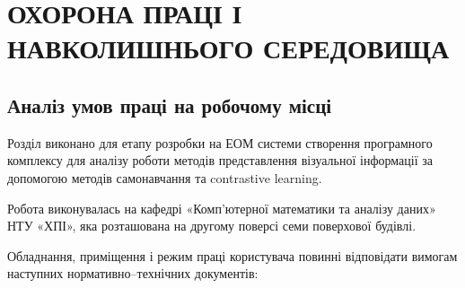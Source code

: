 \section{ОХОРОНА ПРАЦІ І НАВКОЛИШНЬОГО СЕРЕДОВИЩА}

\subsection{Аналіз умов праці на робочому місці}

Розділ виконано для етапу розробки на ЕОМ системи створення програмного комплексу для аналізу роботи методів представлення візуальної інформації за допомогою методів самонавчання та contrastive learning.

Робота виконувалась на кафедрі «Комп’ютерної математики та аналізу даних» НТУ «ХПІ», яка розташована на другому поверсі семи поверхової будівлі.

Обладнання, приміщення і режим праці користувача повинні відповідати вимогам наступних нормативно–технічних документів:

